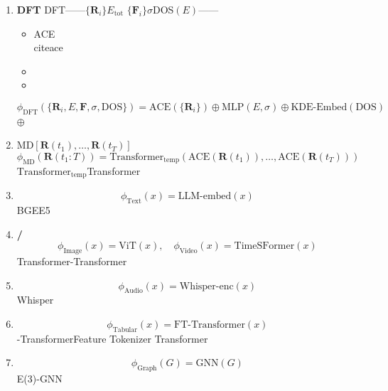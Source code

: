 \documentclass[12pt,a4paper]{article}
\theoremstyle{remark}
\begin{document}
\begin{enumerate}[label=\textbf{ \arabic*},leftmargin=*,itemsep=4pt]
    \item \textbf{DFT}
    DFT——$\{\mathbf{R}_i\}$$E_{\text{tot}}$
    $\{\mathbf{F}_i\}$$\sigma$DOS$(E)$——
    \begin{itemize}[nosep]
        \item ACE~\\cite{ace}
        \item 
        \item 
    \end{itemize}
    
    \begin{equation}\label{eq:dft_encoder}
        \phi_{\text{DFT}}(\{\mathbf{R}_i, E, \mathbf{F}, \sigma, \text{DOS}\}) = 
        \text{ACE}(\{\mathbf{R}_i\}) \oplus \text{MLP}(E, \sigma) \oplus \text{KDE-Embed}(\text{DOS})
    \end{equation}
    $\oplus$

    \item \textbf{}
    MD$[\mathbf{R}(t_1), \ldots, \mathbf{R}(t_T)]$
    \begin{equation}\label{eq:md_encoder}
        \phi_{\text{MD}}(\mathbf{R}(t_1:T)) = \text{Transformer}_{\text{temp}}(\text{ACE}(\mathbf{R}(t_1)), \ldots, \text{ACE}(\mathbf{R}(t_T)))
    \end{equation}
    $\text{Transformer}_{\text{temp}}$Transformer

    \item \textbf{}
    \begin{equation}\label{eq:text_encoder}
        \phi_{\text{Text}}(x) = \text{LLM-embed}(x)
    \end{equation}
    BGEE5

    \item \textbf{/}
    \begin{equation}\label{eq:vision_encoder}
        \phi_{\text{Image}}(x) = \text{ViT}(x), \quad 
        \phi_{\text{Video}}(x) = \text{TimeSFormer}(x)
    \end{equation}
    Transformer-Transformer

    \item \textbf{}
    \begin{equation}\label{eq:audio_encoder}
        \phi_{\text{Audio}}(x) = \text{Whisper-enc}(x)
    \end{equation}
    Whisper

    \item \textbf{}
    \begin{equation}\label{eq:tabular_encoder}
        \phi_{\text{Tabular}}(x) = \text{FT-Transformer}(x)
    \end{equation}
    -TransformerFeature Tokenizer Transformer

    \item \textbf{}
    \begin{equation}\label{eq:graph_encoder}
        \phi_{\text{Graph}}(G) = \text{GNN}(G)
    \end{equation}
    E(3)-GNN
\end{enumerate}
\end{document}
